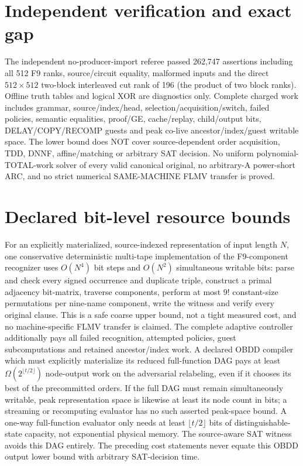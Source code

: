 \documentclass[11pt]{article}
\begin{document}
\section{Independent verification and exact gap}
The independent no-producer-import referee passed 262,747 assertions including all 512 F9 ranks, source/circuit equality, malformed inputs and the direct $512\times512$ two-block interleaved cut rank of 196 (the product of two block ranks). Offline truth tables and logical XOR are diagnostics only. Complete charged work includes grammar, source/index/head, selection/acquisition/switch, failed policies, semantic equalities, proof/GE, cache/replay, child/output bits, DELAY/COPY/RECOMP guests and peak co-live ancestor/index/guest writable space. The lower bound does NOT cover source-dependent order acquisition, TDD, DNNF, affine/matching or arbitrary SAT decision. No uniform polynomial-TOTAL-work solver of every valid canonical original, no arbitrary-A power-short ARC, and no strict numerical SAME-MACHINE FLMV transfer is proved.

\section{Declared bit-level resource bounds}
For an explicitly materialized, source-indexed representation of input length $N$, one conservative deterministic multi-tape implementation of the F9-component recognizer uses $O(N^4)$ bit steps and $O(N^2)$ simultaneous writable bits: parse and check every signed occurrence and duplicate triple, construct a primal adjacency bit-matrix, traverse components, perform at most $9!$ constant-size permutations per nine-name component, write the witness and verify every original clause. This is a safe coarse upper bound, not a tight measured cost, and no machine-specific FLMV transfer is claimed. The complete adaptive controller additionally pays all failed recognition, attempted policies, guest subcomputations and retained ancestor/index work.
A declared OBDD compiler which must explicitly materialize its reduced full-function DAG pays at least $\Omega(2^{\lfloor t/2\rfloor})$ node-output work on the adversarial relabeling, even if it chooses its best of the precommitted orders. If the full DAG must remain simultaneously writable, peak representation space is likewise at least its node count in bits; a streaming or recomputing evaluator has no such asserted peak-space bound. A one-way full-function evaluator only needs at least $\lfloor t/2\rfloor$ bits of distinguishable-state capacity, not exponential physical memory. The source-aware SAT witness avoids this DAG entirely. The preceding cost statements never equate this OBDD output lower bound with arbitrary SAT-decision time.
\end{document}
